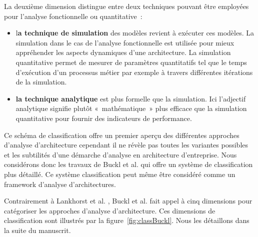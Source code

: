 La deuxième dimension distingue entre deux techniques pouvant être employées pour l'analyse fonctionnelle ou quantitative~:
	\begin{itemize}
		\item l\textbf{a technique de simulation} des modèles revient à exécuter ces modèles. La simulation dans le cas de l'analyse fonctionnelle est utilisée pour mieux appréhender les aspects dynamiques d'une architecture. La simulation quantitative permet de mesurer de paramètres quantitatifs tel que le temps d'exécution d'un processus métier par exemple à travers différentes itérations de la simulation. 
		\item \textbf{la technique analytique} est plus formelle que la simulation. Ici l'adjectif analytique signifie plutôt «~mathématique~» plus efficace que la simulation quantitative pour fournir des indicateurs de performance.  
	\end{itemize}
	
Ce schéma de classification offre un premier aperçu des différentes approches d'analyse d'architecture cependant il ne révèle pas toutes les variantes possibles et les subtilités d'une démarche d'analyse en architecture d'entreprise. Nous considérons donc les travaux de Buckl  et al. qui offre un système de classification plus détaillé. Ce système classification peut même être considéré comme un framework d'analyse d'architectures.

Contrairement à Lankhorst et al. \cite{lankhorst2009enterprise}, Buckl et al. \cite{buckl2009classifying} fait appel à cinq dimensions pour catégoriser les approches d'analyse d'architecture. Ces dimensions de classification sont illustrés par la figure~\ref{fig:classBuckl}. Nous les détaillons dans la suite du manuscrit.

